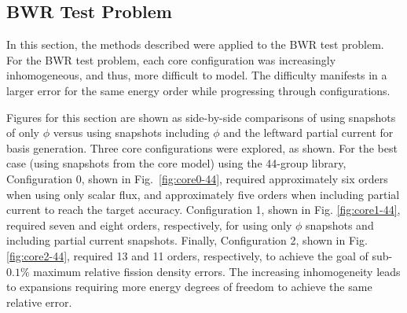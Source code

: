 \documentclass[5p,times,twocolumn,10pt]{elsarticle}
\begin{document}
    \subsection{BWR Test Problem}

    In this section, the methods described
    were applied to the BWR test problem. For the BWR test problem, each core
configuration was increasingly
    inhomogeneous, and thus, more difficult to model.  The difficulty
    manifests in a larger error for the same energy order while progressing
    through configurations.

    Figures for this section are shown as side-by-side comparisons of using
    snapshots of only $\phi$ versus using snapshots including $\phi$ and the
    leftward partial current for basis generation. Three core configurations
    were explored, as shown.
    For the best case (using snapshots from the core model) using the 44-group
    library, Configuration 0,
    shown in Fig.~\ref{fig:core0-44}, required approximately six orders when
    using only scalar flux, and approximately five orders when including partial
    current to reach the target accuracy. Configuration 1, shown in Fig.
    \ref{fig:core1-44}, required seven
    and eight orders, respectively, for using only $\phi$ snapshots and
    including partial
    current snapshots. Finally, Configuration 2, shown in Fig.
    \ref{fig:core2-44},
    required 13 and 11 orders, respectively, to achieve the goal of sub-$0.1\%$
    maximum relative fission density errors.  The increasing inhomogeneity
leads to expansions requiring more energy degrees of freedom to achieve
the
    same relative error.
\end{document}
